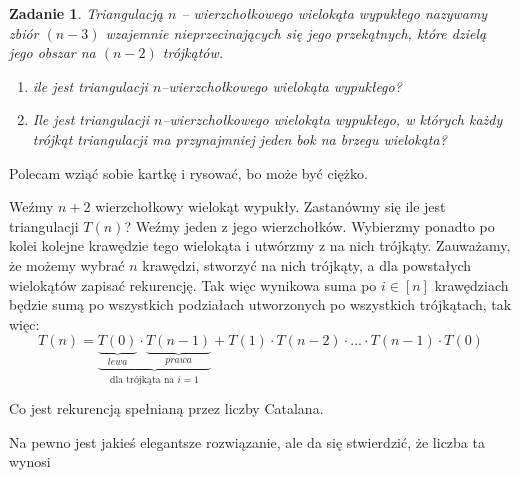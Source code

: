 \documentclass{mwbk}
\newtheorem{zad}{Zadanie}[chapter]
\begin{document}
\begin{zad}
    Triangulacją $n$ -- wierzchołkowego wielokąta wypukłego nazywamy zbiór
    $(n - 3)$ wzajemnie nieprzecinających się jego przekątnych, które dzielą jego obszar na
    $(n - 2)$ trójkątów.
    \begin{enumerate}
        \item ile jest triangulacji $n$--wierzchołkowego wielokąta wypukłego?
        \item Ile jest triangulacji $n$--wierzchołkowego wielokąta wypukłego, w których każdy trójkąt
              triangulacji ma przynajmniej jeden bok na brzegu wielokąta?
    \end{enumerate}
\end{zad}
\begin{mdframed}
    Polecam wziąć sobie kartkę i rysować, bo może być ciężko.
    \begin{enumerate*}
        \item Weźmy $n+2$ wierzchołkowy wielokąt wypukły. Zastanówmy się ile jest triangulacji $T(n)$?
              Weźmy jeden z jego wierzchołków. Wybierzmy ponadto po kolei kolejne krawędzie
              tego wielokąta i utwórzmy z na nich trójkąty.
              Zauważamy, że możemy wybrać $n$ krawędzi, stworzyć na nich trójkąty, a dla powstałych
              wielokątów zapisać rekurencję. Tak więc wynikowa suma po $i \in [n]$ krawędziach będzie sumą po wszystkich podziałach
              utworzonych po wszystkich trójkątach, tak więc:
              \[T(n) = \underbrace{\underbrace{T(0)}_{lewa} \cdot \underbrace{T(n-1)}_{prawa}}_{\text{dla trójkąta na $i = 1$}}  +  T(1) \cdot T(n-2) \cdot ... \cdot T(n-1) \cdot T(0)\]

              Co jest rekurencją spełnianą przez liczby Catalana.

        \item Na pewno jest jakieś elegantsze rozwiązanie, ale da się stwierdzić, że liczba ta wynosi

    \end{enumerate*}



\end{mdframed}
\end{document}

